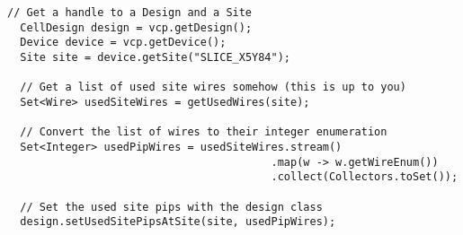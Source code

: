 \begin{lstlisting}[xleftmargin=1.5em, framexleftmargin=1.5em, caption=Code
to transform a set of SiteWires into Site PIPs, label=code:sitePips]
  // Get a handle to a Design and a Site
  CellDesign design = vcp.getDesign();
  Device device = vcp.getDevice();
  Site site = device.getSite("SLICE_X5Y84");

  // Get a list of used site wires somehow (this is up to you)
  Set<Wire> usedSiteWires = getUsedWires(site);

  // Convert the list of wires to their integer enumeration
  Set<Integer> usedPipWires = usedSiteWires.stream()
										 .map(w -> w.getWireEnum())
										 .collect(Collectors.toSet());

  // Set the used site pips with the design class
  design.setUsedSitePipsAtSite(site, usedPipWires);
\end{lstlisting}
